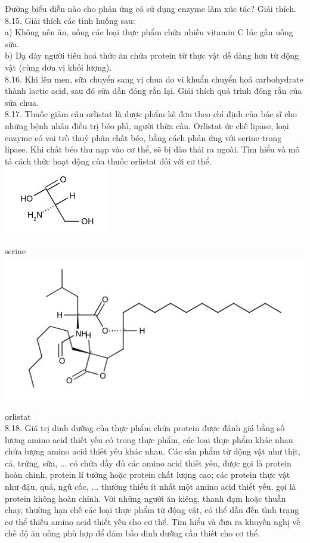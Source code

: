 \documentclass[10pt]{article}
\begin{document}
Đường biểu diễn nào cho phản ứng có sử dụng enzyme làm xúc tác? Giải thích.\\
8.15. Giải thích các tình huống sau:\\
a) Không nên ăn, uống các loại thực phẩm chứa nhiều vitamin C lúc gần uống sữa.\\
b) Dạ dày người tiêu hoá thức ăn chứa protein từ thực vật dễ dàng hơn từ động vật (cùng đơn vị khối lượng).\\
8.16. Khi lên men, sữa chuyển sang vị chua do vi khuẩn chuyển hoá carbohydrate thành lactic acid, sau đó sữa dần đóng rắn lại. Giải thích quá trình đóng rắn của sữa chua.\\
8.17. Thuốc giảm cân orlistat là dược phẩm kê đơn theo chỉ định của bác sĩ cho những bệnh nhân điều trị béo phì, người thừa cân. Orlistat ức chế lipase, loại enzyme có vai trò thuỷ phân chất béo, bằng cách phản ứng với serine trong lipase. Khi chất béo thu nạp vào cơ thể, sẽ bị đào thải ra ngoài. Tìm hiểu và mô tả cách thức hoạt động của thuốc orlistat đối với cơ thể.\\
\includegraphics{smile-dbd1238dd3e6d56c7b81f97f94c61b1d9a229908}

serine\\
\includegraphics{smile-e56e4216fd08f5d32edfc10fffa243e4312b924b}

orlistat\\
8.18. Giá trị dinh dưỡng của thực phẩm chứa protein được đánh giá bằng số lượng amino acid thiết yếu có trong thực phẩm, các loại thực phẩm khác nhau chứa lượng amino acid thiết yếu khác nhau. Các sản phẩm từ động vật như thịt, cá, trứng, sữa, ... có chứa đầy đủ các amino acid thiết yếu, được gọi là protein hoàn chỉnh, protein lí tưởng hoặc protein chất lượng cao; các protein thực vật như đậu, quả, ngũ cốc, $\ldots$ thường thiếu ít nhất một amino acid thiết yếu, gọi là protein không hoàn chỉnh. Với những người ăn kiêng, thanh đạm hoặc thuần chay, thường hạn chế các loại thực phẩm từ động vật, có thể dẫn đến tình trạng cơ thể thiếu amino acid thiết yếu cho cơ thể. Tìm hiểu và đưa ra khuyến nghị về chế độ ăn uống phù hợp để đảm bảo dinh dưỡng cần thiết cho cơ thể.
\end{document}

